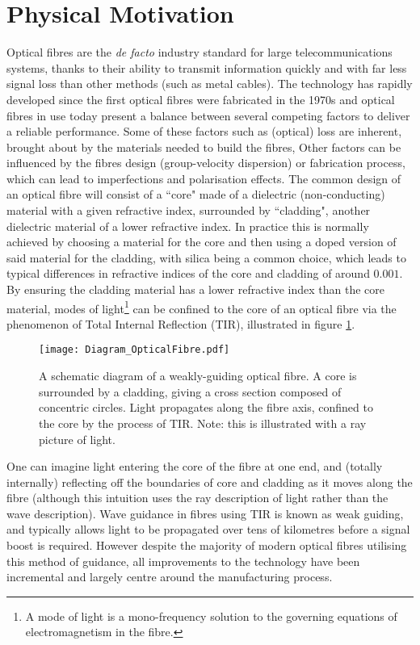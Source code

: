 \section{Physical Motivation} \label{sec:PhysMot}
Optical fibres are the \textit{de facto} industry standard for large telecommunications systems, thanks to their ability to transmit information quickly and with far less signal loss than other methods (such as metal cables).
The technology has rapidly developed since the first optical fibres were fabricated in the 1970s \cite{knight2003photonic} and optical fibres in use today present a balance between several competing factors to deliver a reliable performance.
Some of these factors such as (optical) loss are inherent, brought about by the materials needed to build the fibres,
Other factors can be influenced by the fibres design (group-velocity dispersion) or fabrication process, which can lead to imperfections and polarisation effects.
The common design of an optical fibre will consist of a ``core" made of a dielectric (non-conducting) material with a given refractive index, surrounded by ``cladding", another dielectric material of a lower refractive index.
In practice this is normally achieved by choosing a material for the core and then using a doped version of said material for the cladding, with silica being a common choice, which leads to typical differences in refractive indices of the core and cladding of around $0.001$.
By ensuring the cladding material has a lower refractive index than the core material, modes of light\footnote{A mode of light is a mono-frequency solution to the governing equations of electromagnetism in the fibre.} can be confined to the core of an optical fibre via the phenomenon of Total Internal Reflection (TIR), illustrated in figure \ref{fig:Diagram_OpticalFibre}.
\begin{figure}[h]
	\centering
	\texttt{[image: Diagram\_OpticalFibre.pdf]}
	\caption{\label{fig:Diagram_OpticalFibre} A schematic diagram of a weakly-guiding optical fibre. A core is surrounded by a cladding, giving a cross section composed of concentric circles. Light propagates along the fibre axis, confined to the core by the process of TIR. Note: this is illustrated with a ray picture of light.}
\end{figure} 
One can imagine light entering the core of the fibre at one end, and (totally internally) reflecting off the boundaries of core and cladding as it moves along the fibre (although this intuition uses the ray description of light rather than the wave description).
Wave guidance in fibres using TIR is known as weak guiding, and typically allows light to be propagated over tens of kilometres before a signal boost is required.
However despite the majority of modern optical fibres utilising this method of guidance, all improvements to the technology have been incremental and largely centre around the manufacturing process. \newline

